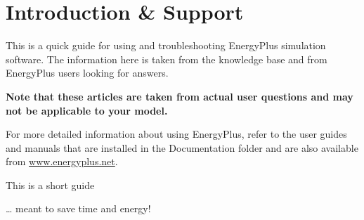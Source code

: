 \chapter{Introduction \& Support}\label{introduction-support}

This is a quick guide for using and troubleshooting EnergyPlus simulation software. The information here is taken from the knowledge base and from EnergyPlus users looking for answers.

\textbf{Note that these articles are taken from actual user questions and may not be applicable to your model.}

For more detailed information about using EnergyPlus, refer to the user guides and manuals that are installed in the Documentation folder and are also available from \href{https://energyplus.net}{www.energyplus.net}.

This is a short guide

\ldots{} meant to save time and energy!
